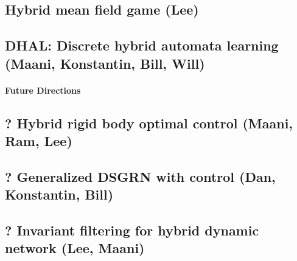 \documentclass[letterpaper,11pt]{article}
\begin{document}
\subsection{Hybrid mean field game (Lee)}
\subsection{DHAL: Discrete hybrid automata learning (Maani, Konstantin, Bill, Will)}
\paragraph*{Future Directions}
\subsection{? Hybrid rigid body optimal control (Maani, Ram, Lee)}
\subsection{? Generalized DSGRN with control (Dan, Konstantin, Bill)}
\subsection{? Invariant filtering for hybrid dynamic network (Lee, Maani)}
\end{document}
